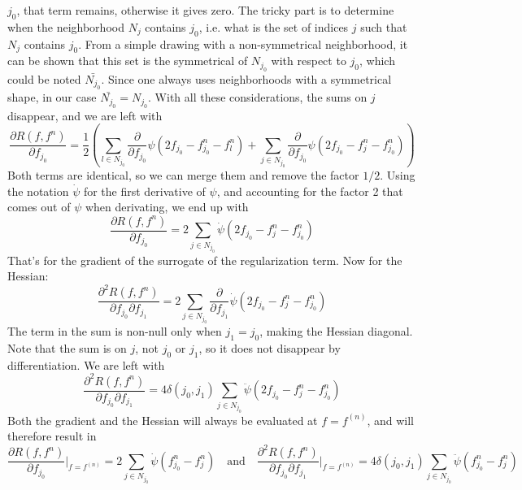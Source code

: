 \documentclass[a4paper, 10pt]{article}
\begin{document}
$j_0$, that term remains, otherwise it gives zero. The tricky part is to determine when the neighborhood $N_j$ contains $j_0$, i.e. what is the set of indices $j$ such that
$N_j$ contains $j_0$. From a simple drawing with a non-symmetrical neighborhood, it can be shown that this set is the symmetrical of $N_{j_0}$ with respect to $j_0$, which 
could be noted $\bar{N_{j_0}}$. Since one always uses neighborhoods with a symmetrical shape, in our case $\bar{N_{j_0}} = N_{j_0}$. With all these considerations, 
the sums on $j$ disappear, and we are left with
\begin{equation*}
\frac{\partial R(f, f^n)}{\partial f_{j_0}} =\frac{1}{2} \left( \sum_{l \in N_{j_0}} \frac{\partial}{\partial f_{j_0}} \psi (2 f_{j_0} - f_{j_0}^n - f_l^n) + \sum_{j \in N_{j_0}} \frac{\partial}{\partial f_{j_0}} \psi(2 f_{j_0} - f_j^n - f_{j_0}^n )\right)
\end{equation*}
Both terms are identical, so we can merge them and remove the factor $1/2$. Using the notation $\dot{\psi}$ for the first derivative of $\psi$, and accounting for the factor 2 that comes out of $\psi$ when derivating, we end up with
\begin{equation*}
\frac{\partial R(f, f^n)}{\partial f_{j_0}} = 2 \sum_{j \in N_{j_0}} \dot{\psi}(2 f_{j_0} - f_j^n - f_{j_0}^n )
\end{equation*}
That's for the gradient of the surrogate of the regularization term. Now for the Hessian:
\begin{equation*}
\frac{\partial^2 R(f, f^n)}{\partial f_{j_0}\partial f_{j_1}} = 2 \sum_{j \in N_{j_0}} \frac{\partial}{\partial f_{j_1}} \dot{\psi}(2 f_{j_0} - f_j^n - f_{j_0}^n )
\end{equation*}
The term in the sum is non-null only when $j_1 = j_0$, making the Hessian diagonal. Note that the sum is on $j$, not $j_0$ or $j_1$, so it does not disappear by differentiation.
We are left with
\begin{equation*}
\frac{\partial^2 R(f, f^n)}{\partial f_{j_0}\partial f_{j_1}} = 4 \delta(j_0, j_1) \sum_{j \in N_{j_0}} \ddot{\psi}(2 f_{j_0} - f_j^n - f_{j_0}^n )
\end{equation*}
Both the gradient and the Hessian will always be evaluated at $f = f^{(n)}$, and will therefore result in
\begin{equation*}
\frac{\partial R(f, f^n)}{\partial f_{j_0}}\Bigr|_{f = f^{(n)}} = 2 \sum_{j \in N_{j_0}} \dot{\psi}(f_{j_0}^n - f_j^n) \quad \text{and} \quad \frac{\partial^2 R(f, f^n)}{\partial f_{j_0}\partial f_{j_1}}\Bigr|_{f = f^{(n)}} = 4 \delta(j_0, j_1) \sum_{j \in N_{j_0}} \ddot{\psi}(f_{j_0}^n - f_j^n)
\end{equation*}
\end{document}
